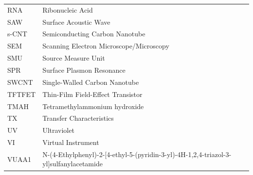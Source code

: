 \documentclass[
  a4paper,
]{scrbook}
\begin{document}
\begin{spacing}{1.2}
\newpage
\fancyhf{} %
\thispagestyle{fancy} %
\renewcommand{\headrulewidth}{0pt}
\fancyfoot[L]{\thepage} %
\begin{table}[H]
  \begin{tabular}{@{}p{} p{}@{}}  %
    RNA  & Ribonucleic Acid   \\[5pt]
    SAW  & Surface Acoustic Wave   \\[5pt]
    s-CNT  & Semiconducting Carbon Nanotube   \\[5pt]
    SEM  & Scanning Electron Microscope/Microscopy   \\[5pt]
    SMU  & Source Measure Unit   \\[5pt]
    SPR  & Surface Plasmon Resonance   \\[5pt]
    SWCNT  & Single-Walled Carbon Nanotube   \\[5pt]
    TFTFET  & Thin-Film Field-Effect Transistor  \\[5pt]
    TMAH  & Tetramethylammonium hydroxide  \\[5pt]
    TX  & Transfer Characteristics  \\[5pt]
    UV  & Ultraviolet  \\[5pt]
    VI  & Virtual Instrument  \\[5pt]
    VUAA1  & N-(4-Ethylphenyl)-2-{[4-ethyl-5-(pyridin-3-yl)-4H-1,2,4-triazol-3-yl]sulfanyl}acetamide  \\[5pt] 
  \end{tabular}
\end{table}

\makeatletter
\setlength{\@fptop}{0pt plus 1fil}
\setlength{\@fpbot}{0pt plus 1fil}
\makeatother

\fancyhf{} %
\thispagestyle{fancy} %
\renewcommand{\headrulewidth}{0pt}
\fancyfoot[L]{\thepage} %

\clearpage
\newpage

\end{spacing}

\pagestyle{headings}
\mainmatter
{}
\end{document}

